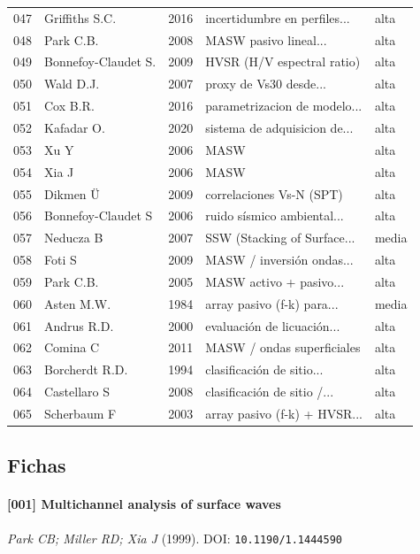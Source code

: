 \begin{longtable}{@{}p{0.9cm} p{3.5cm} p{0.9cm} p{3.4cm} p{6.4cm}@{}}
047 & Griffiths S.C. & 2016 & incertidumbre en perfiles... & alta \\
048 & Park C.B. & 2008 & MASW pasivo lineal... & alta \\
049 & Bonnefoy-Claudet S. & 2009 & HVSR (H/V espectral ratio) & alta \\
050 & Wald D.J. & 2007 & proxy de Vs30 desde... & alta \\
051 & Cox B.R. & 2016 & parametrizacion de modelo... & alta \\
052 & Kafadar O. & 2020 & sistema de adquisicion de... & alta \\
053 & Xu Y & 2006 & MASW & alta \\
054 & Xia J & 2006 & MASW & alta \\
055 & Dikmen Ü & 2009 & correlaciones Vs-N (SPT) & alta \\
056 & Bonnefoy-Claudet S & 2006 & ruido sísmico ambiental... & alta \\
057 & Neducza B & 2007 & SSW (Stacking of Surface... & media \\
058 & Foti S & 2009 & MASW / inversión ondas... & alta \\
059 & Park C.B. & 2005 & MASW activo + pasivo... & alta \\
060 & Asten M.W. & 1984 & array pasivo (f-k) para... & media \\
061 & Andrus R.D. & 2000 & evaluación de licuación... & alta \\
062 & Comina C & 2011 & MASW / ondas superficiales & alta \\
063 & Borcherdt R.D. & 1994 & clasificación de sitio... & alta \\
064 & Castellaro S & 2008 & clasificación de sitio /... & alta \\
065 & Scherbaum F & 2003 & array pasivo (f-k) + HVSR... & alta \\
\end{longtable}
\normalsize

\subsection{Fichas}

\paragraph{[001] Multichannel analysis of surface waves} \emph{Park CB; Miller RD; Xia J} (1999).
{\scriptsize DOI: \texttt{10.1190/1.1444590}}

